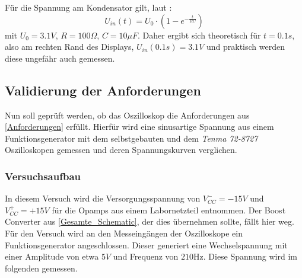 \newline
Für die Spannung am Kondensator gilt, laut \cite{Kondensator_Ladekurve}:
$$
U_{in}(t) = U_0 \cdot (1 - e^{- \frac{t}{RC}})
$$
mit $U_0 = 3.1V$, $R=100 \Omega$, $C = 10\mu F$.
Daher ergibt sich theoretisch für $t=0.1s$, also am rechten Rand des Displays, $U_{in}(0.1s) = 3.1V$
und praktisch werden diese ungefähr auch gemessen.


\newpage
\subsection{Validierung der Anforderungen}
Nun soll geprüft werden, ob das Oszilloskop die Anforderungen aus \ref{Anforderungen} erfüllt.
Hierfür wird eine sinusartige Spannung aus einem Funktionsgenerator mit dem selbstgebauten
und dem \textit{Tenma 72-8727} Oszilloskopen gemessen und deren Spannungskurven verglichen.


\subsubsection{Versuchsaufbau}
In diesem Versuch wird die Versorgungsspannung von $V^-_{CC} = -15V$ und $V^+_{CC} = +15V$
für die Opamps aus einem Labornetzteil entnommen. Der Boost Converter aus \ref{Gesamte_Schematic},
der dies übernehmen sollte, fällt hier weg. \newline
Für den Versuch wird an den Messeingängen der Oszilloskope ein Funktionsgenerator angeschlossen.
Dieser generiert eine Wechselspannung mit einer Amplitude von etwa $5V$ und Frequenz von $210\si{\hertz}$.
Diese Spannung wird im folgenden gemessen.


